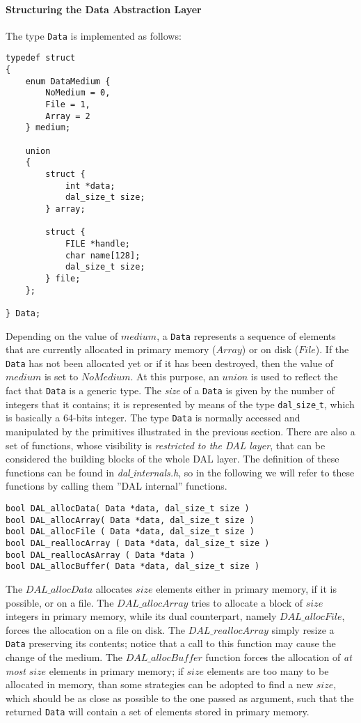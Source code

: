 \paragraph{Structuring the Data Abstraction Layer}
The type \texttt{Data} is implemented as follows:
\begin{lstlisting}
typedef struct
{
	enum DataMedium {
		NoMedium = 0,
		File = 1,
		Array = 2
	} medium;
	
	union 
	{
		struct {
			int *data;
			dal_size_t size;
		} array;
		
		struct {
			FILE *handle;
			char name[128];
			dal_size_t size;
		} file;
	};
	
} Data;
\end{lstlisting}
Depending on the value of $medium$, a \texttt{Data} represents a sequence of elements that are currently allocated in primary memory ($Array$) or on disk ($File$). If the \texttt{Data} has not been allocated yet or if it has been destroyed, then the value of $medium$ is set to $NoMedium$. At this purpose, an $union$ is used to reflect the fact that \texttt{Data} is a generic type. The \textit{size} of a \texttt{Data} is given by the number of integers that it contains; it is represented by means of the type \texttt{dal$\_$size$\_$t}, which is basically a 64-bits integer. The type \texttt{Data} is normally accessed and manipulated by the primitives illustrated in the previous section. There are also a set of functions, whose visibility is \textit{restricted to the DAL layer}, that can be considered the building blocks of the whole DAL layer. The definition of these functions can be found in \textit{dal$\_$internals.h}, so in the following we will refer to these functions by calling them ''DAL internal'' functions.
\begin{lstlisting}
bool DAL_allocData( Data *data, dal_size_t size )
bool DAL_allocArray( Data *data, dal_size_t size )
bool DAL_allocFile ( Data *data, dal_size_t size )
bool DAL_reallocArray ( Data *data, dal_size_t size )
bool DAL_reallocAsArray ( Data *data )
bool DAL_allocBuffer( Data *data, dal_size_t size )
\end{lstlisting}
The $DAL\_allocData$ allocates $size$ elements either in primary memory, if it is possible, or on a file. The $DAL\_allocArray$ tries to allocate a block of $size$ integers in primary memory, while its dual counterpart, namely $DAL\_allocFile$, forces the allocation on a file on disk. The $DAL\_reallocArray$ simply resize a \texttt{Data} preserving its contents; notice that a call to this function may cause the change of the medium. The $DAL\_allocBuffer$ function forces the allocation of \textit{at most} $size$ elements in primary memory; if $size$ elements are too many to be allocated in memory, than some strategies can be adopted to find a new $size$, which should be as close as possible to the one passed as argument, such that the returned \texttt{Data} will contain a set of elements stored in primary memory.
